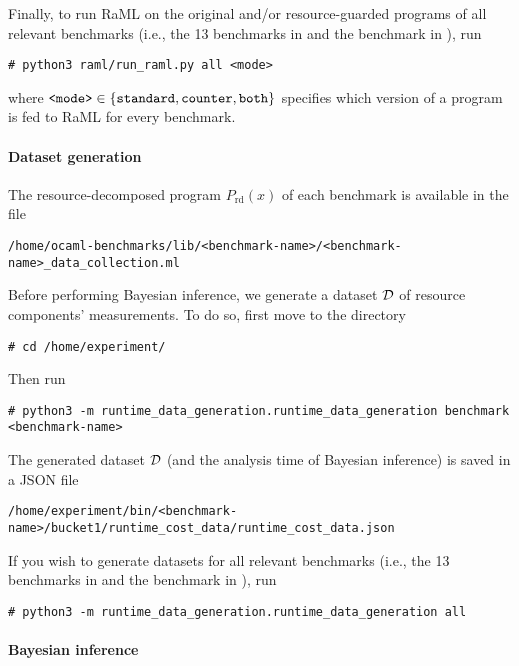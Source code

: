 Finally, to run RaML on the original and/or resource-guarded programs of all
relevant benchmarks (i.e., the 13 benchmarks in
 and the benchmark \kruskal{} in
), run
\begin{verbatim}
# python3 raml/run_raml.py all <mode>
\end{verbatim}
where $\texttt{<mode>} \in \{ {\texttt{standard}, \texttt{counter},
    \texttt{both}} \}$ specifies which version of a program is fed to RaML for
every benchmark.

\paragraph{Dataset generation}

The resource-decomposed program $P_{\mathrm{rd}}(x)$ of each benchmark is
available in the file
\begin{verbatim}
/home/ocaml-benchmarks/lib/<benchmark-name>/<benchmark-name>_data_collection.ml
\end{verbatim}

Before performing Bayesian inference, we generate a dataset $\mathcal{D}$ of resource
components' measurements.
%
To do so, first move to the directory
\begin{verbatim}
# cd /home/experiment/
\end{verbatim}
%
Then run
\begin{verbatim}
# python3 -m runtime_data_generation.runtime_data_generation benchmark <benchmark-name>
\end{verbatim}
%
The generated dataset $\mathcal{D}$ (and the analysis time of Bayesian inference) is
saved in a JSON file
\begin{verbatim}
/home/experiment/bin/<benchmark-name>/bucket1/runtime_cost_data/runtime_cost_data.json
\end{verbatim}

If you wish to generate datasets for all relevant benchmarks (i.e., the 13
benchmarks in  and the benchmark
\quicksorttiml{} in ), run
\begin{verbatim}
# python3 -m runtime_data_generation.runtime_data_generation all
\end{verbatim}

\paragraph{Bayesian inference}

